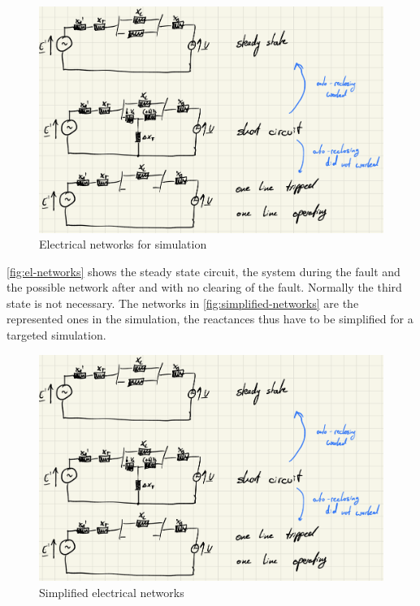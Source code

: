 \begin{figure}[H]
        \centering
        \includegraphics[width=.7\textwidth]{images/electrical_networks.png}
        \caption[Electrical networks for simulation]{Electrical networks for simulation}
        \label{fig:el-networks}
\end{figure}

\autoref{fig:el-networks} shows the steady state circuit, the system during the fault and the possible network after and with no clearing of the fault. Normally the third state is not necessary. The networks in \autoref{fig:simplified-networks} are the represented ones in the simulation, the reactances thus have to be simplified for a targeted simulation.

\begin{figure}[H]
        \centering
        \includegraphics[width=.7\textwidth]{images/electrical_networks.png}
        \caption[Simplified electrical networks]{Simplified electrical networks}
        \label{fig:simplified-networks}
\end{figure}

